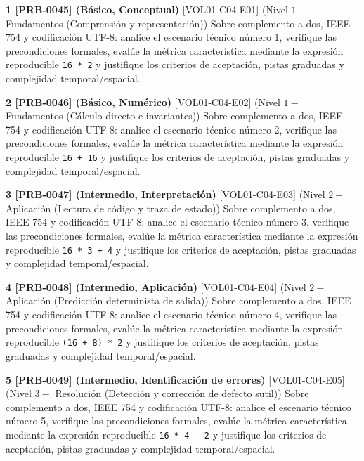 \documentclass{book}
\begin{document}
\begin{tcolorbox}[title={Ejercicios}, studiumworked, breakable]

\noindent\textbf{1 [PRB-0045] (Básico, Conceptual)}
[VOL01-C04-E01] (Nivel \(1 -\) Fundamentos (Comprensión y representación)) Sobre complemento a dos, IEEE 754 y codificación UTF-8: analice el escenario técnico número 1, verifique las precondiciones formales, evalúe la métrica característica mediante la expresión reproducible \texttt{16 * 2} y justifique los criterios de aceptación, pistas graduadas y complejidad temporal/espacial.

\noindent\textbf{2 [PRB-0046] (Básico, Numérico)}
[VOL01-C04-E02] (Nivel \(1 -\) Fundamentos (Cálculo directo e invariantes)) Sobre complemento a dos, IEEE 754 y codificación UTF-8: analice el escenario técnico número 2, verifique las precondiciones formales, evalúe la métrica característica mediante la expresión reproducible \texttt{16 + 16} y justifique los criterios de aceptación, pistas graduadas y complejidad temporal/espacial.

\noindent\textbf{3 [PRB-0047] (Intermedio, Interpretación)}
[VOL01-C04-E03] (Nivel \(2 -\) Aplicación (Lectura de código y traza de estado)) Sobre complemento a dos, IEEE 754 y codificación UTF-8: analice el escenario técnico número 3, verifique las precondiciones formales, evalúe la métrica característica mediante la expresión reproducible \texttt{16 * 3 + 4} y justifique los criterios de aceptación, pistas graduadas y complejidad temporal/espacial.

\noindent\textbf{4 [PRB-0048] (Intermedio, Aplicación)}
[VOL01-C04-E04] (Nivel \(2 -\) Aplicación (Predicción determinista de salida)) Sobre complemento a dos, IEEE 754 y codificación UTF-8: analice el escenario técnico número 4, verifique las precondiciones formales, evalúe la métrica característica mediante la expresión reproducible \texttt{(16 + 8) * 2} y justifique los criterios de aceptación, pistas graduadas y complejidad temporal/espacial.

\noindent\textbf{5 [PRB-0049] (Intermedio, Identificación de errores)}
[VOL01-C04-E05] (Nivel \(3 -\) Resolución (Detección y corrección de defecto sutil)) Sobre complemento a dos, IEEE 754 y codificación UTF-8: analice el escenario técnico número 5, verifique las precondiciones formales, evalúe la métrica característica mediante la expresión reproducible \texttt{16 * 4 - 2} y justifique los criterios de aceptación, pistas graduadas y complejidad temporal/espacial.


\end{tcolorbox}
\end{document}
